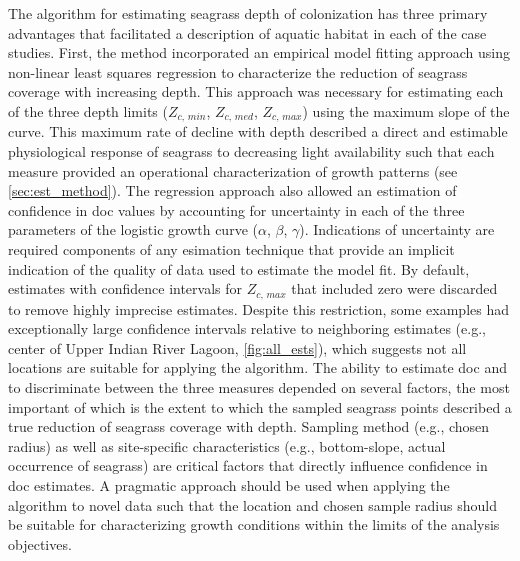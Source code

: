 \documentclass[letterpaper,12pt,oneside]{article}\usepackage[]{graphicx}\usepackage[]{color}
\begin{document}
The algorithm for estimating seagrass depth of colonization has three primary advantages that facilitated a description of aquatic habitat in each of the case studies.  First, the method incorporated an empirical model fitting approach using non-linear least squares regression to characterize the reduction of seagrass coverage with increasing depth.  This approach was necessary for estimating each of the three depth limits ($Z_{c,\,min}$, $Z_{c,\,med}$, $Z_{c,\,max}$) using the maximum slope of the curve.  This maximum rate of decline with depth described a direct and estimable physiological response of seagrass to decreasing light availability such that each measure provided an operational characterization of growth patterns (see \cref{sec:est_method}).  The regression approach also allowed an estimation of confidence in \ac{doc} values by accounting for uncertainty in each of the three parameters of the logistic growth curve ($\alpha$, $\beta$, $\gamma$). Indications of uncertainty are required components of any esimation technique that provide an implicit indication of the quality of data used to estimate the model fit.  By default, estimates with confidence intervals for $Z_{c,\,max}$ that included zero were discarded to remove highly imprecise estimates.  Despite this restriction, some examples had exceptionally large confidence intervals relative to neighboring estimates (e.g., center of Upper Indian River Lagoon, \cref{fig:all_ests}), which suggests not all locations are suitable for applying the algorithm. The ability to estimate \ac{doc} and to discriminate between the three measures depended on several factors, the most important of which is the extent to which the sampled seagrass points described a true reduction of seagrass coverage with depth.  Sampling method (e.g., chosen radius) as well as site-specific characteristics (e.g., bottom-slope, actual occurrence of seagrass) are critical factors that directly influence confidence in \ac{doc} estimates.  A pragmatic approach should be used when applying the algorithm to novel data such that the location and chosen sample radius should be suitable for characterizing growth conditions within the limits of the analysis objectives. 
\end{document}
